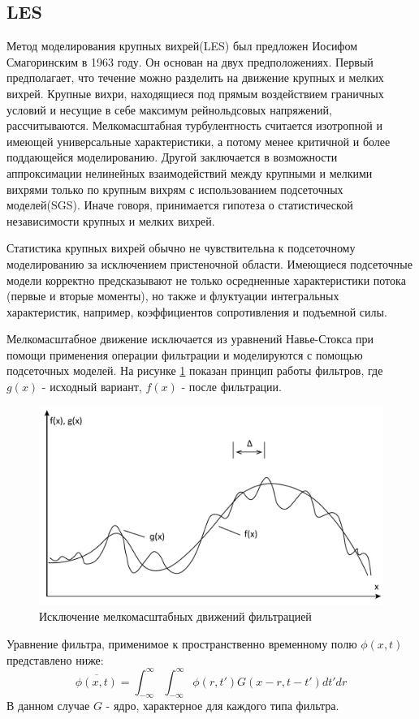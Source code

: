 \subsection{LES}
	
	Метод моделирования крупных вихрей(LES) был предложен Иосифом Смагоринским в 1963 году. Он основан на двух предположениях. Первый предполагает, что течение можно разделить на движение крупных и мелких вихрей. Крупные вихри, находящиеся под прямым воздействием граничных условий и несущие в себе максимум рейнольдсовых напряжений, рассчитываются. Мелкомасштабная турбулентность считается изотропной и имеющей универсальные характеристики, а потому менее критичной и более поддающейся моделированию. Другой  заключается в возможности аппроксимации нелинейных взаимодействий между крупными и мелкими вихрями только по крупным вихрям с использованием подсеточных моделей(SGS). Иначе говоря, принимается гипотеза о статистической независимости крупных и мелких вихрей.
	
	Статистика крупных вихрей обычно не чувствительна к подсеточному моделированию за исключением пристеночной области. Имеющиеся подсеточные модели корректно предсказывают не только осредненные характеристики потока (первые и вторые моменты), но также и флуктуации интегральных характеристик, например, коэффициентов сопротивления и подъемной силы\cite{Fureby2000}.
	
	Мелкомасштабное движение исключается из уравнений Навье-Стокса при помощи применения операции фильтрации и моделируются с помощью подсеточных моделей. На рисунке \ref{fig:lesfilter} показан принцип работы фильтров, где $g(x)$ - исходный вариант, $f(x)$ - после фильтрации.\\
	\begin{figure}[H]
		\centering
		\includegraphics[width=0.7\linewidth]{../Assets/ФильтрацияLES}
		\caption{Исключение мелкомасштабных движений фильтрацией}
		\label{fig:lesfilter}
	\end{figure}
	Уравнение фильтра, применимое к пространственно временному полю $\phi(x,t)$ представлено ниже:
	\begin{equation}
		\overline{\phi(x,t)} = \int_{-\infty}^{\infty}\int_{-\infty}^{\infty}\phi(r,t')G(x - r, t - t')dt'dr
	\end{equation}
	В данном случае $G$ - ядро, характерное для каждого типа фильтра.
	
